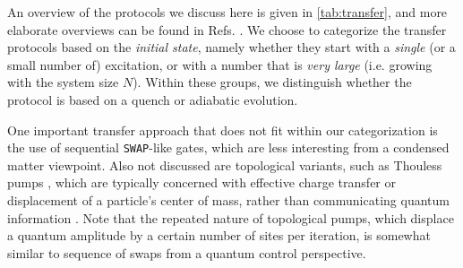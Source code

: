 An overview of the protocols we discuss here is given in \cref{tab:transfer}, and more elaborate overviews can be found in Refs. \cite{Bose2007,Nikolopoulos2014,Menchon-Enrich2016}. We choose to categorize the transfer protocols based on the \emph{initial state}, namely whether they start with a \emph{single} (or a small number of) excitation, or with a number that is \emph{very large} (i.e. growing with the system size $N$). Within these groups, we distinguish whether the protocol is based on a quench or adiabatic evolution.

One important transfer approach that does not fit within our categorization is the use of sequential \texttt{SWAP}-like gates, which are less interesting from a condensed matter viewpoint. Also not discussed are topological variants, such as Thouless pumps \cite{Thouless1983,Voorden2019}, which are typically concerned with effective charge transfer or displacement of a particle's center of mass, rather than communicating quantum information \cite{Citro2016}. Note that the repeated nature of topological pumps, which displace a quantum amplitude by a certain number of sites per iteration, is somewhat similar to sequence of swaps from a quantum control perspective. 





%

